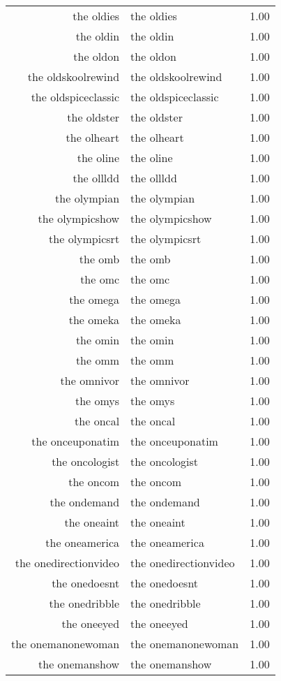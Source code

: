 \begin{table}[ht]
\begin{tabular}{rlr}
  the oldies & the oldies & 1.00 \\ 
  the oldin & the oldin & 1.00 \\ 
  the oldon & the oldon & 1.00 \\ 
  the oldskoolrewind & the oldskoolrewind & 1.00 \\ 
  the oldspiceclassic & the oldspiceclassic & 1.00 \\ 
  the oldster & the oldster & 1.00 \\ 
  the olheart & the olheart & 1.00 \\ 
  the oline & the oline & 1.00 \\ 
  the ollldd & the ollldd & 1.00 \\ 
  the olympian & the olympian & 1.00 \\ 
  the olympicshow & the olympicshow & 1.00 \\ 
  the olympicsrt & the olympicsrt & 1.00 \\ 
  the omb & the omb & 1.00 \\ 
  the omc & the omc & 1.00 \\ 
  the omega & the omega & 1.00 \\ 
  the omeka & the omeka & 1.00 \\ 
  the omin & the omin & 1.00 \\ 
  the omm & the omm & 1.00 \\ 
  the omnivor & the omnivor & 1.00 \\ 
  the omys & the omys & 1.00 \\ 
  the oncal & the oncal & 1.00 \\ 
  the onceuponatim & the onceuponatim & 1.00 \\ 
  the oncologist & the oncologist & 1.00 \\ 
  the oncom & the oncom & 1.00 \\ 
  the ondemand & the ondemand & 1.00 \\ 
  the oneaint & the oneaint & 1.00 \\ 
  the oneamerica & the oneamerica & 1.00 \\ 
  the onedirectionvideo & the onedirectionvideo & 1.00 \\ 
  the onedoesnt & the onedoesnt & 1.00 \\ 
  the onedribble & the onedribble & 1.00 \\ 
  the oneeyed & the oneeyed & 1.00 \\ 
  the onemanonewoman & the onemanonewoman & 1.00 \\ 
  the onemanshow & the onemanshow & 1.00 \\ 

\end{tabular}
\end{table}
